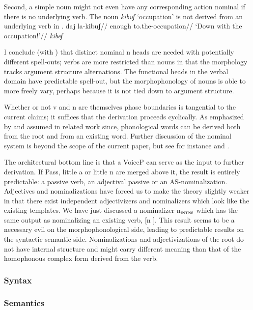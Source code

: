 Second, a simple noun might not even have any corresponding action nominal if there is no underlying verb. The noun \emph{kibuʃ} `occupation' is not derived from an underlying verb in {\tpie}. 
\pex
	\a \begingl
		\gla daj la-kibuʃ//
		\glb enough to.the-occupation//
		\glft `Down with the occupation!'//
	\endgl	
	\a \ljudge{*} \emph{kibeʃ}
\xe

I conclude (with \citealt{arad03}) that distinct nominal n heads are needed with potentially different spell-outs; verbs are more restricted than nouns in that the morphology tracks argument structure alternations. The functional heads in the verbal domain have predictable spell-out, but the morphophonology of nouns is able to more freely vary, perhaps because it is not tied down to argument structure.

Whether or not v and n are themselves phase boundaries is tangential to the current claims; it suffices that the derivation proceeds cyclically. As emphasized by \cite{arad03,arad05} and assumed in related work since, phonological words can be derived both from the root and from an existing word. Further discussion of the nominal system is beyond the scope of the current paper, but see for instance \cite{fausthever10} and \cite{laks15ws}.


The architectural bottom line is that a VoiceP can serve as the input to further derivation. If Pass, little a or little n are merged above it, the result is entirely predictable: a passive verb, an adjectival passive or an AS-nominalization. Adjectives and nominalizations have forced us to make the theory slightly weaker in that there exist independent adjectivizers and nominalizers which look like the existing templates. We have just discussed a nominalizer n$_{\gsc{INTNS}}$ which has the same output as nominalizing an existing verb, [n \tpie]. This result seems to be a necessary evil on the morphophonological side, leading to predictable results on the syntactic-semantic side. Nominalizations and adjectivizations of the root do not have internal structure and might carry different meaning than that of the homophonous complex form derived from the verb.

		\subsubsection{Syntax}
		
		\subsubsection{Semantics}
		
